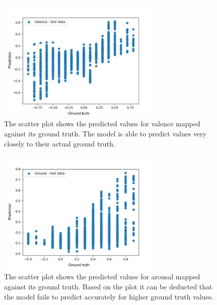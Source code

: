 \begin{figure}[htbp]
  \centering
  \includegraphics[width=0.7\textwidth]{Figures/ScatterPlot_Valence.png}
  \caption[Scatter plot for valence with the proposed approach]{The scatter plot shows the predicted values for valence mapped against its ground truth. The model is able to predict values very closely to their actual ground truth.}
  \label{fig:ScatterPlotValence}
\end{figure}

\begin{figure}[htbp]
  \centering
  \includegraphics[width=0.7\textwidth]{Figures/ScatterPlot_Arousal.png}
  \caption[Scatter plot for arousal with the proposed approach]{The scatter plot shows the predicted values for arousal mapped against its ground truth. Based on the plot it can be deducted that the model fails to predict accurately for higher ground truth values.}
  \label{fig:ScatterPlotArousal}
\end{figure}

